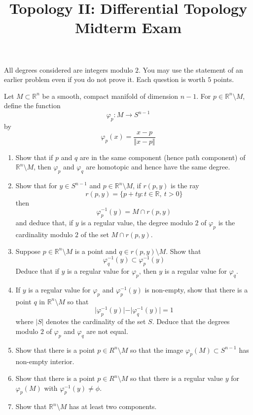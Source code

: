 \documentclass[12pt]{article}
\newcommand{\R}{\mathbb{R}}
\begin{document}
\title{Topology II: Differential Topology\\
Midterm Exam} 
\date{}
\maketitle

\thispagestyle{empty}

All degrees considered are integers modulo $2$. You may use the statement of an earlier problem even if you do not prove it. Each question is worth $5$ points.

Let $M\subset \R^n$ be a smooth, compact manifold of dimension $n-1$. For $p\in \R^n\setminus M$, define the function
$$\varphi_p:M\to S^{n-1}$$
by
$$\varphi_p(x)=\frac{x-p}{\Vert x-p\Vert}$$



\begin{enumerate}

\item Show that if $p$ and $q$ are in the same component (hence path component) of $\R^n\setminus M$, then $\varphi_p$ and $\varphi_q$ are homotopic and hence have the same degree.

\item Show that for $y\in S^{n-1}$ and $p\in \R^n\setminus M$, if $r(p,y)$ is the ray
$$r(p,y)=\{p+ty: t\in\R,\ t>0\}$$
then 
$$\varphi_p^{-1}(y)=M\cap r(p,y)$$
and deduce that, if $y$ is a regular value, the degree modulo $2$ of $\varphi_p$ is the cardinality modulo $2$ of the set $M\cap r(p,y)$.

\item Suppose $p\in\R^n\setminus M$ is a point and $q\in r(p,y)\setminus M$. Show that $$\varphi_q^{-1}(y)\subset \varphi_p^{-1}(y)$$
Deduce that if $y$ is a regular value for $\varphi_p$, then $y$ is a regular value for $\varphi_q$.
\item If $y$ is a regular value for $\varphi_p$ and $\varphi_p^{-1}(y)$ is non-empty, show that there is a point $q$ in $\R^n\setminus M$ so that 
$$\vert \varphi_p^{-1}(y)\vert - \vert \varphi_q^{-1}(y)\vert=1$$
where $\vert S\vert$ denotes the cardinality of the set $S$. Deduce that the degrees modulo $2$ of $\varphi_p$ and $\varphi_q$ are not equal.
\item Show that there is a point $p\in R^n\setminus M$ so that the image $\varphi_p(M)\subset S^{n-1}$ has non-empty interior.
\item Show that there is a point $p\in R^n\setminus M$ so that there is a regular value $y$ for $\varphi_p(M)$ with $\varphi_p^{-1}(y)\neq\phi$.
\item Show that $\R^n\setminus M$ has at least two components.
\end{enumerate}
\end{document}
